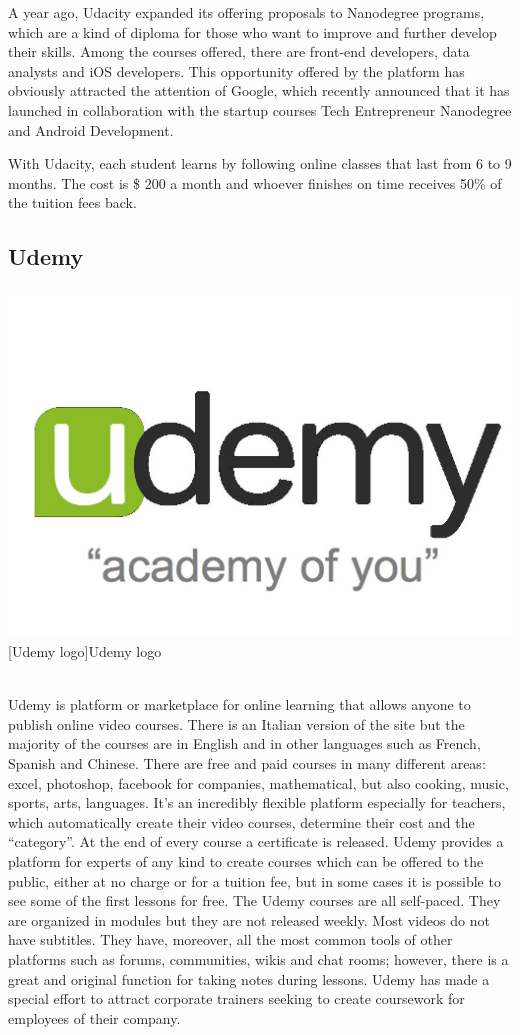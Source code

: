 A year ago, Udacity expanded its offering proposals to Nanodegree programs, which are a kind of diploma for those who want to improve and further develop their skills. Among the courses offered, there are front-end developers, data analysts and iOS developers. This opportunity offered by the platform has obviously attracted the attention of Google, which recently announced that it has launched in collaboration with the startup courses Tech Entrepreneur Nanodegree and Android Development.

With Udacity, each student learns by following online classes that last from 6 to 9 months. The cost is \$ 200 a month and whoever finishes on time receives 50\% of the tuition fees back.



\subsection{Udemy}
\label{subsec:udemy}

\begin{minipage}{\linewidth}
      \centering
      \includegraphics[width=0.5\linewidth]{images/chapter1/udemy.jpg}
      [Udemy logo]{Udemy logo}
  \end{minipage}
  \\

Udemy is platform or marketplace for online learning that allows anyone to publish online video  courses. There is an Italian version of the site but the majority of the courses are in English and in other languages such as French, Spanish and Chinese.
There are free and paid courses in many different areas: excel, photoshop, facebook for companies, mathematical, but also cooking, music, sports, arts, languages.
It's an incredibly flexible platform especially for teachers, which automatically create their video courses, determine their cost and the “category”.
At the end of every course a certificate is released. Udemy provides a platform for experts of any kind to create courses which can be offered to the public, either at no charge or for a tuition fee, but in some cases it is possible to see some of the first lessons for free.
The Udemy courses are all self-paced. They are organized in modules but they are not released weekly. Most videos do not have subtitles. They have, moreover, all the most common tools of other platforms such as forums, communities, wikis and chat rooms; however, there is a great and original function for taking notes during lessons.
Udemy has made a special effort to attract corporate trainers seeking to create coursework for employees of their company.\cite{mooc_udemy}